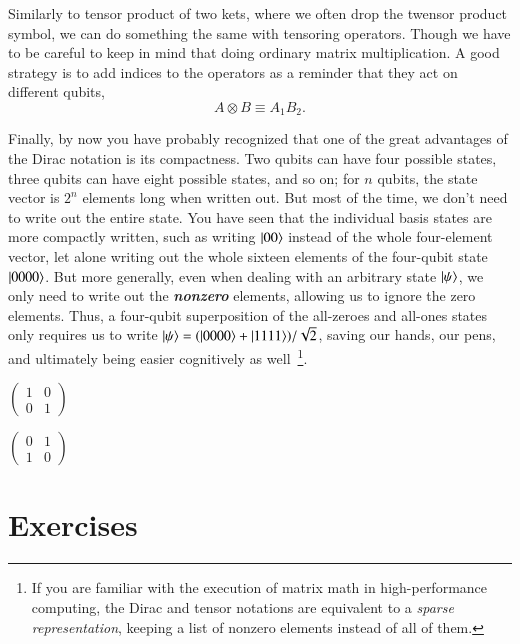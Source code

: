 Similarly to tensor product of two kets, where we often drop the twensor product symbol, we can do something the same with tensoring operators.
Though we have to be careful to keep in mind that doing ordinary matrix multiplication.
A good strategy is to add indices to the operators as a reminder that they act on different qubits,
\begin{equation}
    A \otimes B \equiv A_1B_2.
\end{equation}

Finally, by now you have probably recognized that one of the great advantages of the Dirac notation is its compactness. Two qubits can have four possible states, three qubits can have eight possible states, and so on; for $n$ qubits, the state vector is $2^n$ elements long when written out. But most of the time, we don't need to write out the entire state.  You have seen that the individual basis states are more compactly written, such as writing $\left| 00 \right\rangle$ instead of the whole four-element vector, let alone writing out the whole sixteen elements of the four-qubit state $\left| 0000 \right\rangle$. But more generally, even when dealing with an arbitrary state $\left| \psi \right\rangle$, we only need to write out the \textbf{\emph{nonzero}} elements, allowing us to ignore the zero elements.  Thus, a four-qubit superposition of the all-zeroes and all-ones states only requires us to write $\left| \psi \right\rangle = (\left| 0000 \right\rangle + \left| 1111 \right\rangle)/\sqrt{2}$, saving our hands, our pens, and ultimately being easier cognitively as well~\footnote{If you are familiar with the execution of matrix math in high-performance computing, the Dirac and tensor notations are equivalent to a \emph{sparse representation}, keeping a list of nonzero elements instead of all of them.}.

$\left(\begin{array}{ll}
1 & 0 \\
0 & 1
\end{array}\right)$

$\left(\begin{array}{ll}
0 & 1 \\
1 & 0
\end{array}\right)$
\fi

\newpage

\section{Exercises}

